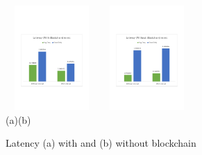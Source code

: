 \documentclass[final,5p,times,twocolumn]{elsarticle}
\begin{document}
%
\begin{figure}[h]
	\begin{center}
	\centering
		\includegraphics[width=35mm, height=40mm]{Latency1}
		\hspace{20pt}
		\includegraphics[width=35mm, height=40mm]{Latency2}\\
        \footnotesize{(a)\hspace{120pt}(b)}\\		 
   	\caption{Latency (a) with and (b) without blockchain} \label{fig:latency}
	\end{center}
\end{figure}
%
\end{document}

